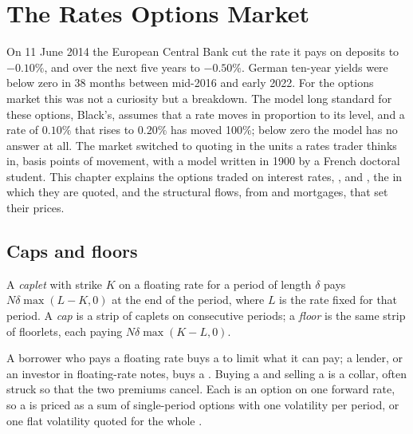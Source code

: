 \chapter{The Rates Options Market}\label{ch:m2:the-rates-options-market}

On 11 June 2014 the European Central Bank cut the rate it pays on deposits to
$-0.10\%$, and over the next five years to $-0.50\%$. German ten-year yields
were below zero in 38 months between mid-2016 and early 2022. For the options
market this was not a curiosity but a breakdown. The model long standard for
these options, Black's, assumes that a
rate moves in proportion to its level, and a rate of $0.10\%$ that rises to
$0.20\%$ has moved 100\%; below zero the model has no answer at all. The market
switched to quoting in the units a rates trader thinks in, basis points of
movement, with a model written in 1900 by a French doctoral student. This
chapter explains the options traded on interest rates, ,  and
, the  in which they are quoted, and the structural
flows, from  and mortgages, that set their prices.

\section{Caps and floors}

\begin{definition}\label{def:m2:the-rates-options-market:cap}
A \emph{caplet} with strike $K$ on a floating rate for a period of
length $\delta$ pays $N\delta\max(L - K, 0)$ at the end of the period, where $L$
is the rate fixed for that period. A \emph{cap} is a strip of
caplets on consecutive periods; a \emph{floor} is the same strip of
floorlets, each paying $N\delta\max(K - L, 0)$.
\end{definition}

A borrower who pays a floating rate buys a  to limit what it can pay; a
lender, or an investor in floating-rate notes, buys a . Buying a  and
selling a  is a collar, often struck so that the two premiums cancel. Each
 is an option on one forward rate, so a  is priced as a sum of
single-period options with one volatility per period, or one flat volatility
quoted for the whole .

